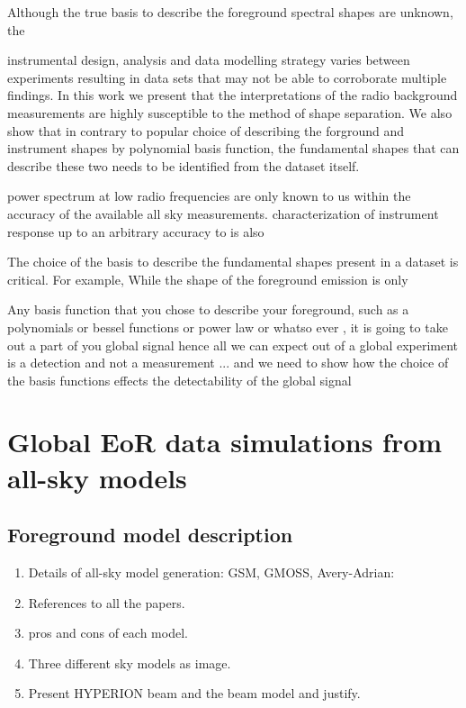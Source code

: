 \documentclass{aastex62}
\begin{document}
Although the true basis to describe the foreground spectral shapes are unknown, the 

instrumental design, analysis and data modelling strategy varies between experiments resulting in data sets that may not be able to corroborate multiple findings.  In this work we present that the interpretations of the radio background measurements are highly susceptible to the method of shape separation. We also show that in contrary to popular choice of describing the forground and instrument shapes by polynomial basis function, the fundamental shapes that can describe these two needs to be identified from the dataset itself. 


 power spectrum at low radio frequencies are only known to us within the accuracy of the available all sky measurements. characterization of instrument response up to an arbitrary accuracy to is also 

The choice of the basis to describe the fundamental shapes present in a dataset is critical.  For example,  While the shape of the foreground emission is only 


Any basis function that you chose to describe your foreground, such as a polynomials or bessel functions or power law or whatso ever , it is going to take out a part of you global signal 
hence all we can expect out of a global experiment is a detection and not a measurement ... 
and we need to show how the choice of the basis functions effects the detectability of the global signal 

\section{Global EoR data simulations from all-sky models} \label{sec:style}
\subsection{Foreground model description}
\begin{enumerate}
\item
Details of all-sky model generation: GSM, GMOSS, Avery-Adrian: 
\item
References to all the papers.
\item
pros and cons of each model.
\item
Three different sky models as image.
\item
Present HYPERION beam and the beam model and justify.
\end{enumerate}
\end{document}
